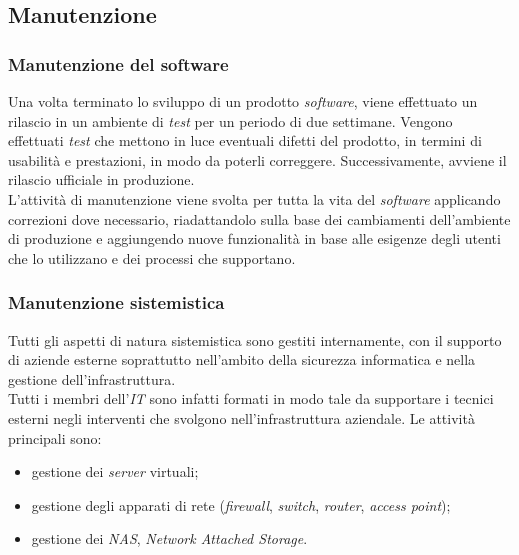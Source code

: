 
\subsection{Manutenzione}
 
 \subsubsection{Manutenzione del software}
Una volta terminato lo sviluppo di un prodotto \textit{software}, viene effettuato un rilascio in un ambiente di \textit{test} per un periodo di due settimane. Vengono effettuati \textit{test} che mettono in luce eventuali difetti del prodotto, in termini di usabilità e prestazioni, in modo da poterli correggere. Successivamente, avviene il rilascio ufficiale in produzione.\\
L'attività di manutenzione viene svolta per tutta la vita del \textit{software} applicando correzioni dove necessario, riadattandolo sulla base dei cambiamenti dell'ambiente di produzione e aggiungendo nuove funzionalità in base alle esigenze degli utenti che lo utilizzano e dei processi che supportano.
 
 \subsubsection{Manutenzione sistemistica}
Tutti gli aspetti di natura sistemistica sono gestiti internamente, con il supporto di aziende esterne soprattutto nell'ambito della sicurezza informatica e nella gestione dell'infrastruttura.\\ Tutti i membri dell'\textit{IT} sono infatti formati in modo tale da supportare i tecnici esterni negli interventi che svolgono nell'infrastruttura aziendale. Le attività principali sono:
\begin{itemize}
	\item gestione dei \textit{server} virtuali;
	\item gestione degli apparati di rete (\textit{firewall}, \textit{switch}, \textit{router}, \textit{access point});
	\item gestione dei \textit{NAS}, \textit{Network Attached Storage}.
\end{itemize}

